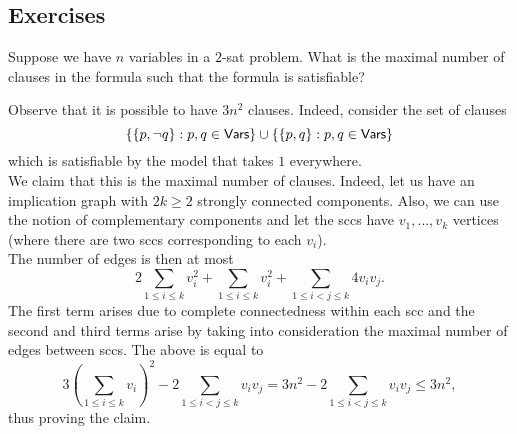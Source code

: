 \subsection{Exercises}

\begin{exercise}
	Suppose we have $n$ variables in a $2$-sat problem. What is the maximal number of clauses in the formula such that the formula is satisfiable?
\end{exercise}
\begin{solution*}
	Observe that it is possible to have $3n^2$ clauses. Indeed, consider the set of clauses
	\[ \{\{p,\neg q\} : p,q\in\mathsf{Vars}\}\cup\{\{p,q\} : p,q\in\mathsf{Vars}\} \]
	which is satisfiable by the model that takes $1$ everywhere.\\
	We claim that this is the maximal number of clauses. Indeed, let us have an implication graph with $2k\geq 2$ strongly connected components. Also, we can use the notion of complementary components and let the sccs have $v_1,\ldots,v_k$ vertices (where there are two sccs corresponding to each $v_i$).\\
	The number of edges is then at most
	\[ 2\sum_{1\leq i\leq k} v_i^2 + \sum_{1\leq i\leq k} v_i^2 + \sum_{1\leq i<j\leq k} 4 v_i v_j. \]
	The first term arises due to complete connectedness within each scc and the second and third terms arise by taking into consideration the maximal number of edges between sccs. The above is equal to
	\[ 3\left(\sum_{1\leq i\leq k} v_i\right)^2 - 2\sum_{1\leq i<j\leq k} v_i v_j = 3n^2 - 2\sum_{1\leq i<j\leq k} v_i v_j \leq 3n^2, \]
	thus proving the claim.
\end{solution*}